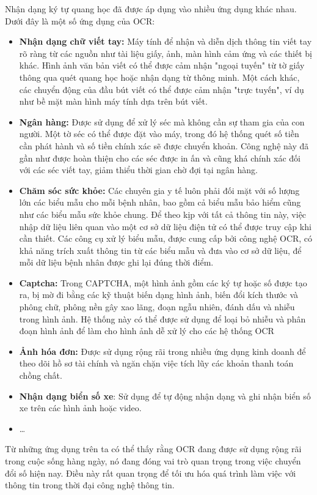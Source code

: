 Nhận dạng ký tự quang học đã được áp dụng vào nhiều ứng dụng khác nhau. Dưới đây là một  số ứng dụng của OCR: \cite{survey_ocr_Applications}
\begin{itemize}
    \item \textbf{Nhận dạng chữ viết tay:} Máy tính để nhận và diễn dịch thông tin viết tay rõ ràng từ các nguồn như tài liệu giấy, ảnh, màn hình cảm ứng và các thiết bị khác. Hình ảnh văn bản viết có thể được cảm nhận "ngoại tuyến" từ tờ giấy thông qua quét quang học hoặc nhận dạng từ thông minh. Một cách khác, các chuyển động của đầu bút viết có thể được cảm nhận "trực tuyến", ví dụ như bề mặt màn hình máy tính dựa trên bút viết.
    \item \textbf{Ngân hàng:} Được sử dụng để xử lý séc mà không cần sự tham gia của con người. Một tờ séc có thể được đặt vào máy, trong đó hệ thống quét số tiền cần phát hành và số tiền chính xác sẽ được chuyển khoản. Công nghệ này đã gần như được hoàn thiện cho các séc được in ấn và cũng khá chính xác đối với các séc viết tay, giảm thiểu thời gian chờ đợi tại ngân hàng.
    \item \textbf{Chăm sóc sức khỏe:} Các chuyên gia y tế luôn phải đối mặt với số lượng lớn các biểu mẫu cho mỗi bệnh nhân, bao gồm cả biểu mẫu bảo hiểm cũng như các biểu mẫu sức khỏe chung. Để theo kịp với tất cả thông tin này, việc nhập dữ liệu liên quan vào một cơ sở dữ liệu điện tử có thể được truy cập khi cần thiết. Các công cụ xử lý biểu mẫu, được cung cấp bởi công nghệ OCR, có khả năng trích xuất thông tin từ các biểu mẫu và đưa vào cơ sở dữ liệu, để mỗi dữ liệu bệnh nhân được ghi lại đúng thời điểm.
    \item \textbf{Captcha:} Trong CAPTCHA, một hình ảnh gồm các ký tự hoặc số được tạo ra, bị mờ đi bằng các kỹ thuật biến dạng hình ảnh, biến đổi kích thước và phông chữ, phông nền gây xao lãng, đoạn ngẫu nhiên, đánh dấu và nhiễu trong hình ảnh. Hệ thống này có thể được sử dụng để loại bỏ nhiễu và phân đoạn hình ảnh để làm cho hình ảnh dễ xử lý cho các hệ thống OCR 
    \item \textbf{Ảnh hóa đơn:} Được sử dụng rộng rãi trong nhiều ứng dụng kinh doanh để theo dõi hồ sơ tài chính và ngăn chặn việc tích lũy các khoản thanh toán chồng chất.
    \item \textbf{Nhận dạng biển số xe}: Sử dụng để tự động nhận dạng và ghi nhận biển số xe trên các hình ảnh hoặc video.
    \item \ldots
\end{itemize}

Từ những ứng dụng trên ta có thể thấy rằng OCR đang được sử dụng rộng rãi trong cuộc sống hàng ngày, nó đang đóng vai trò quan trọng trong việc chuyển đổi số hiện nay. Điều này rất quan trọng để tối ưu hóa quá trình làm việc với thông tin trong thời đại công nghệ thông tin.

